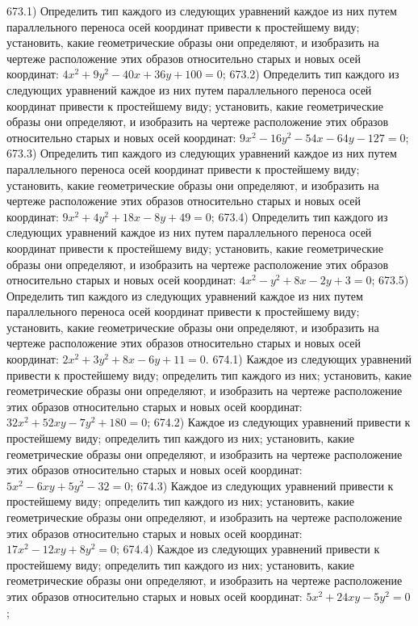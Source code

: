 673.1) Определить тип каждого из следующих уравнений каждое из них путем параллельного переноса осей координат привести к простейшему виду; установить, какие геометрические образы они определяют, и изобразить на чертеже расположение этих образов относительно старых и новых осей координат: $4 x^2+9 y^2-40 x+36 y+100=0$;
673.2) Определить тип каждого из следующих уравнений каждое из них путем параллельного переноса осей координат привести к простейшему виду; установить, какие геометрические образы они определяют, и изобразить на чертеже расположение этих образов относительно старых и новых осей координат: $9 x^2-16 y^2-54 x-64 y-127=0$;
673.3) Определить тип каждого из следующих уравнений каждое из них путем параллельного переноса осей координат привести к простейшему виду; установить, какие геометрические образы они определяют, и изобразить на чертеже расположение этих образов относительно старых и новых осей координат: $9 x^2+4 y^2+18 x-8 y+49=0$;
673.4) Определить тип каждого из следующих уравнений каждое из них путем параллельного переноса осей координат привести к простейшему виду; установить, какие геометрические образы они определяют, и изобразить на чертеже расположение этих образов относительно старых и новых осей координат: $4 x^2-y^2+8 x-2 y+3=0$;
673.5) Определить тип каждого из следующих уравнений каждое из них путем параллельного переноса осей координат привести к простейшему виду; установить, какие геометрические образы они определяют, и изобразить на чертеже расположение этих образов относительно старых и новых осей координат: $2 x^2+3 y^2+8 x-6 y+11=0$.
674.1) Каждое из следующих уравнений привести к простейшему виду; определить тип каждого из них; установить, какие геометрические образы они определяют, и изобразить на чертеже расположение этих образов относительно старых и новых осей координат: $32 x^2+52 x y-7 y^2+180=0$;
674.2) Каждое из следующих уравнений привести к простейшему виду; определить тип каждого из них; установить, какие геометрические образы они определяют, и изобразить на чертеже расположение этих образов относительно старых и новых осей координат: $5 x^2-6 x y+5 y^2-32=0$;
674.3) Каждое из следующих уравнений привести к простейшему виду; определить тип каждого из них; установить, какие геометрические образы они определяют, и изобразить на чертеже расположение этих образов относительно старых и новых осей координат: $17 x^2-12 x y+8 y^2=0$;
674.4) Каждое из следующих уравнений привести к простейшему виду; определить тип каждого из них; установить, какие геометрические образы они определяют, и изобразить на чертеже расположение этих образов относительно старых и новых осей координат: $5 x^2+24 x y-5 y^2=0$;
